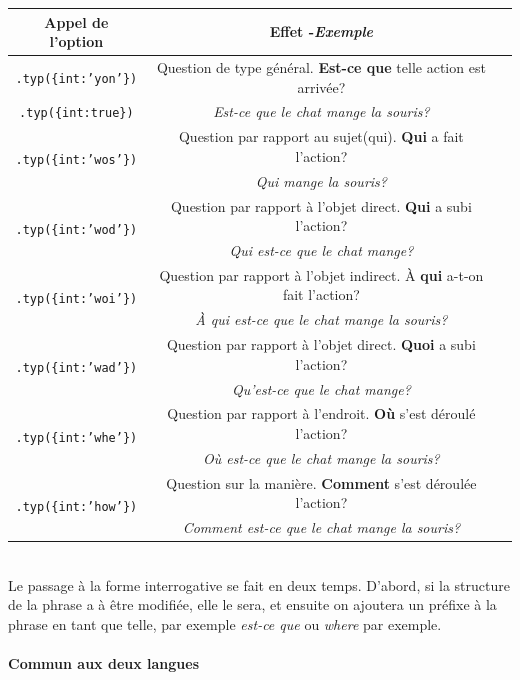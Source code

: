 \documentclass[11pt]{article} %
\newcommand{\real}[1]{\emph{#1}}
\begin{document}
\begin{tabular}{|c|c|c|}
\hline 
Appel de l'option & Effet -\small{\real{Exemple}}\\
\hline 
\hline 
\texttt{.typ(\{int:'yon'\})} & Question de type général.\textbf{ Est-ce que} telle action est arrivée? \\
\texttt{.typ(\{int:true\})} & \small{\real{Est-ce que le chat mange la souris?}}\\
\hline
\multirow{2}{*}{\texttt{.typ(\{int:'wos'\})}} & Question par rapport au sujet(qui). \textbf{Qui} a fait l'action?\\
& \small{\real{Qui mange la souris?}}\\ \hline
\multirow{2}{*}{\texttt{.typ(\{int:'wod'\})}} & Question par rapport à l'objet direct. \textbf{Qui} a subi l'action?\\
& \small{\real{Qui est-ce que le chat mange?}}\\
\hline 
\multirow{2}{*}{\texttt{.typ(\{int:'woi'\})}} & Question par rapport à l'objet indirect. À \textbf{qui} a-t-on fait
l'action?\\
&\small{\real{À qui est-ce que le chat mange la souris?}}\\
\hline 
\multirow{2}{*}{\texttt{.typ(\{int:'wad'\})}} & Question par rapport à l'objet direct. \textbf{Quoi} a subi l'action?\\
&\small{\real{Qu'est-ce que le chat mange?}} \\ \hline 
\multirow{2}{*}{\texttt{.typ(\{int:'whe'\})}} & Question par rapport à l'endroit. \textbf{Où }s'est déroulé l'action?\\
& \small{\real{Où est-ce que le chat mange la souris?}} \\ \hline 
\multirow{2}{*}{\texttt{.typ(\{int:'how'\})}} & Question sur la manière. \textbf{Comment }s'est déroulée l'action?\\
& \small{\real{Comment est-ce que le chat mange la souris?}} \\ \hline 
\end{tabular}
\\
Le passage à la forme interrogative se fait en deux temps. D'abord,
si la structure de la phrase a à être modifiée, elle le sera, et ensuite
on ajoutera un préfixe à la phrase en tant que telle, par exemple
\emph{est-ce que }ou \emph{where} par exemple.

\paragraph{Commun aux deux langues}
\end{document}
